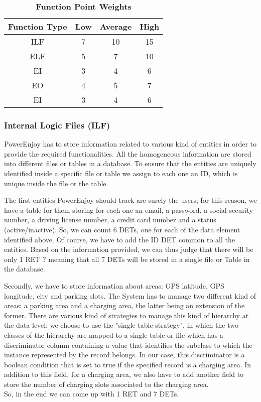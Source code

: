 \begin{longtable}{| c | c | c | c |}
	\caption{\textbf{Function Point Weights}} %
	\label{tab:fp_weights}%
	\\ \hline %
	
	\textbf{Function Type} & \textbf{Low} & \textbf{Average} & \textbf{High}\\ \hline
	ILF & 7 & 10 & 15\\ \hline
	ELF & 5 & 7 & 10\\ \hline
	EI & 3 & 4 & 6\\ \hline
	EO & 4 & 5 & 7\\ \hline
	EI & 3 & 4 & 6\\ \hline	
\end{longtable}

\subsubsection{Internal Logic Files (ILF)}
PowerEnjoy has to store information related to various kind of entities in order to provide the required functionalities. All the homogeneous information are stored into different files or tables in a database. To ensure that the entities are uniquely identified inside a specific file or table we assign to each one an ID, which is unique inside the file or the table.
\bigskip

The first entities PowerEnjoy should track are surely the users; for this reason, we have a table for them storing for each one an email, a password, a social security number, a driving license number, a credit card number and a status (active/inactive). 
So, we can count 6 DETs, one for each of the data element identified above. Of course, we have to add the ID DET common to all the entities. Based on the information provided, we can thus judge that there will be only 1 RET ? meaning that all 7 DETs will be stored in a single file or Table in the database.
\bigskip

Secondly, we have to store information about areas: GPS latitude, GPS longitude, city and parking slots. The System has to manage two different kind of areas: a parking area and a charging area, the latter being an extension of the former. There are various kind of strategies to manage this kind of hierarchy at the data level; we choose to use the "single table strategy", in which the two classes of the hierarchy are mapped to a single table or file which has a discriminator column containing a value that identifies the subclass to which the instance represented by the record belongs. In our case, this discriminator is a boolean condition that is set to true if the specified record is a charging area. In addition to this field, for a charging area, we also have to add another field to store the number of charging slots associated to the charging area.\\
So, in the end we can come up with 1 RET and 7 DETs.
\bigskip

